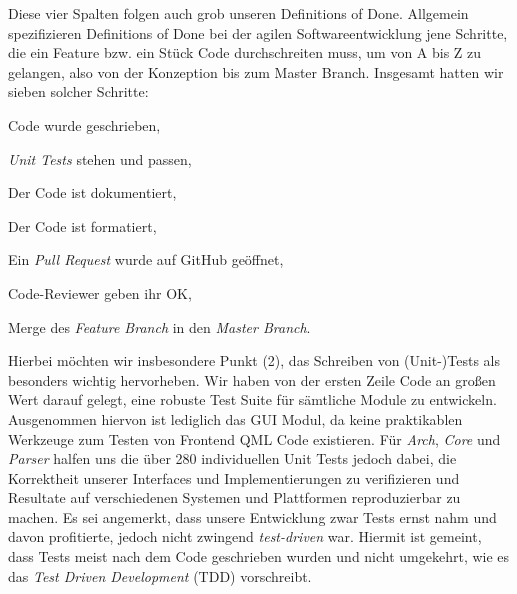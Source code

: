Diese vier Spalten folgen auch grob unseren Definitions of Done. Allgemein
spezifizieren Definitions of Done bei der agilen Softwareentwicklung jene
Schritte, die ein Feature bzw. ein Stück Code durchschreiten muss, um von A bis
Z zu gelangen, also von der Konzeption bis zum Master Branch. Insgesamt hatten
wir sieben solcher Schritte:
\begin{senumerate}{-0.5cm}
  \item Code wurde geschrieben,
  \item \emph{Unit Tests} stehen und passen,
  \item Der Code ist dokumentiert,
  \item Der Code ist formatiert,
  \item Ein \emph{Pull Request} wurde auf GitHub geöffnet,
  \item Code-Reviewer geben ihr OK,
  \item Merge des \emph{Feature Branch} in den \emph{Master Branch}.
  \vspace{-0.5cm}
\end{senumerate}

Hierbei möchten wir insbesondere Punkt (2), das Schreiben von (Unit-)Tests als
besonders wichtig hervorheben. Wir haben von der ersten Zeile Code an großen
Wert darauf gelegt, eine robuste Test Suite für sämtliche Module zu entwickeln.
Ausgenommen hiervon ist lediglich das GUI Modul, da keine praktikablen Werkzeuge
zum Testen von Frontend QML Code existieren. Für \emph{Arch}, \emph{Core} und
\emph{Parser} halfen uns die über 280 individuellen Unit Tests jedoch dabei, die
Korrektheit unserer Interfaces und Implementierungen zu verifizieren und
Resultate auf verschiedenen Systemen und Plattformen reproduzierbar zu machen.
Es sei angemerkt, dass unsere Entwicklung zwar Tests ernst nahm und davon
profitierte, jedoch nicht zwingend \emph{test-driven} war. Hiermit ist gemeint,
dass Tests meist nach dem Code  geschrieben wurden und nicht umgekehrt, wie es
das \emph{Test Driven Development} (TDD) vorschreibt.
\vspace{-0.2cm}
